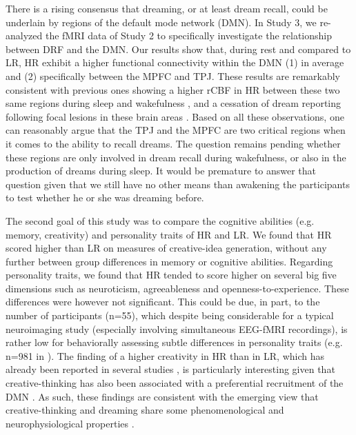 There is a rising consensus that dreaming, or at least dream recall, could be underlain by regions of the default mode network (DMN). In Study 3, we re-analyzed the fMRI data of Study 2 to specifically investigate the relationship between DRF and the DMN. Our results show that, during rest and compared to LR, HR exhibit a higher functional connectivity within the DMN (1) in average and (2) specifically between the MPFC and TPJ. These results are remarkably consistent with previous ones showing a higher rCBF in HR between these two same regions during sleep and wakefulness \citep{eichenlaub_resting_2014}, and a cessation of dream reporting following focal lesions in these brain areas \citep{solms_neuropsychology_1997}. Based on all these observations, one can reasonably argue that the TPJ and the MPFC are two critical regions when it comes to the ability to recall dreams. The question remains pending whether these regions are only involved in dream recall during wakefulness, or also in the production of dreams during sleep. It would be premature to answer that question given that we still have no other means than awakening the participants to test whether he or she was dreaming before.

The second goal of this study was to compare the cognitive abilities (e.g. memory, creativity) and personality traits of HR and LR. We found that HR scored higher than LR on measures of creative-idea generation, without any further between group differences in memory or cognitive abilities. Regarding personality traits, we found that HR tended to score higher on several big five dimensions such as neuroticism, agreeableness and openness-to-experience. These differences were however not significant. This could be due, in part, to the number of participants (n=55), which despite being considerable for a typical neuroimaging study (especially involving simultaneous EEG-fMRI recordings), is rather low for behaviorally assessing subtle differences in personality traits (e.g. n=981 in \citealp{hartmann_boundaries_1989}). The finding of a higher creativity in HR than in LR, which has already been reported in several studies \citep{fitch_variations_1989, schredl_creativity_1995, schredl_factors_2003}, is particularly interesting given that creative-thinking has also been associated with a preferential recruitment of the DMN \citep{ellamil_evaluative_2012, jung_structure_2013, beaty_creativity_2014, mok_interplay_2014, beaty_default_2015, christoff_mind-wandering_2016}. As such, these findings are consistent with the emerging view that creative-thinking and dreaming share some phenomenological and neurophysiological properties \citep{christoff_mind-wandering_2016}.


